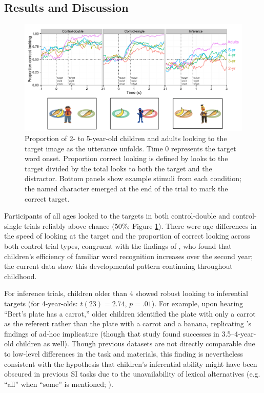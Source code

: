 \documentclass[10pt,letterpaper]{article}
\begin{document}
\subsection{Results and Discussion}

\begin{figure}[t]
\begin{center} 
  \includegraphics[width=.8\textwidth]{figures/expt1-accuracy.pdf}
  \caption{\label{fig:age} Proportion of 2- to 5-year-old children and adults looking to the target image as the utterance unfolds. Time 0 represents the target word onset. Proportion correct looking is defined by looks to the target divided by the total looks to both the target and the distractor. Bottom panels show example stimuli from each condition; the named character emerged at the end of the trial to mark the correct target.}
  \end{center} 
\end{figure}


Participants of all ages looked to the targets in both control-double and control-single trials reliably above chance (50\%; Figure \ref{fig:age}). There were age differences in the speed of looking at the target and the proportion of correct looking across both control trial types, congruent with the findings of , who found that children's efficiency of familiar word recognition increases over the second year; the current data show this developmental pattern continuing throughout childhood. 

For inference trials, children older than 4 showed robust looking to inferential targets (for 4-year-olds: $t(23) = 2.74$, $p =.01$). For example, upon hearing ``Bert's plate has a carrot,'' older children identified the plate with only a carrot as the referent rather than the plate with a carrot and a banana, replicating 's findings of ad-hoc implicature (though that study found successes in 3.5--4-year-old children as well). Though previous datasets are not directly comparable due to low-level differences in the task and materials, this finding is nevertheless consistent with the hypothesis that children's inferential ability might have been obscured in previous SI tasks due to the unavailability of lexical alternatives (e.g. ``all'' when ``some'' is mentioned; ).
\end{document}
